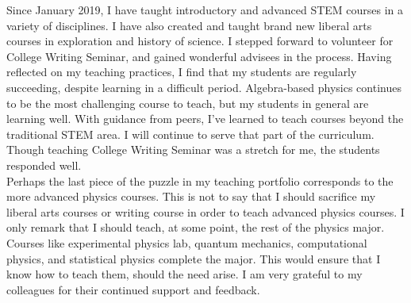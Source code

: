 \documentclass[../../main.tex]{subfiles}
\begin{document}
Since January 2019, I have taught introductory and advanced STEM courses in a variety of disciplines.  I have also created and taught brand new liberal arts courses in exploration and history of science.  I stepped forward to volunteer for College Writing Seminar, and gained wonderful advisees in the process.  Having reflected on my teaching practices, I find that my students are regularly succeeding, despite learning in a difficult period.  Algebra-based physics continues to be the most challenging course to teach, but my students in general are learning well.  With guidance from peers, I've learned to teach courses beyond the traditional STEM area.  I will continue to serve that part of the curriculum.  Though teaching College Writing Seminar was a stretch for me, the students responded well.
\\
\vspace{0.25cm}
Perhaps the last piece of the puzzle in my teaching portfolio corresponds to the more advanced physics courses.  This is not to say that I should sacrifice my liberal arts courses or writing course in order to teach advanced physics courses.  I only remark that I should teach, at some point, the rest of the physics major.  Courses like experimental physics lab, quantum mechanics, computational physics, and statistical physics complete the major.  This would ensure that I know how to teach them, should the need arise.  I am very grateful to my colleagues for their continued support and feedback.
\end{document}
